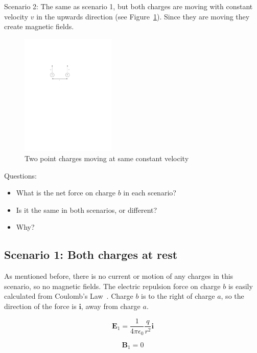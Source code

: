 \documentclass[a4paper]{article}
\theoremstyle{plain}
\theoremstyle{definition}
\newcommand{\ihat}{\textbf{i}}
\newcommand{\vect}[1]{\textbf{#1}}
\begin{document}
Scenario 2: The same as scenario 1, but both charges are moving with
constant velocity $v$ in the upwards direction (see
Figure~\ref{fig:two-charges-moving}).  Since they are moving they
create magnetic fields.

\begin{figure}[ht]
	\centering
	\includegraphics[width=0.4\textwidth]{two-charges-moving-cropped.pdf}
	\caption{Two point charges moving at same constant velocity}
	\label{fig:two-charges-moving}
\end{figure}

Questions:
\begin{itemize}
  \item What is the net force on charge $b$ in each scenario?
  \item Is it the same in both scenarios, or different?
  \item Why?
\end{itemize}


\subsection{Scenario 1: Both charges at rest}

As mentioned before, there is no current or motion of any charges in
this scenario, so no magnetic fields.  The electric repulsion force on
charge $b$ is easily calculated from Coulomb's Law~\cite{CoulombsLaw}.
Charge $b$ is to the right of charge $a$, so the direction of the force is
$\ihat$, away from charge $a$.

\begin{equation}
\vect{E}_1 = \frac{1}{4 \pi \epsilon_0} \frac{q}{r^2} \ihat \label{eq:E1}
\end{equation}

\begin{equation}
\vect{B}_1 = 0
\end{equation}
\end{document}
